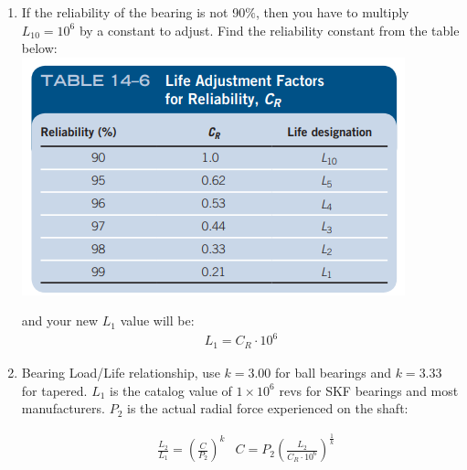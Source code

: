 \documentclass[11pt, fleqn]{article}
\begin{document}
\begin{enumerate}
\begin{enumerate}
            \item If the reliability of the bearing is not 90$\%$, then you have to multiply $L_{10} = 10^6$ by a constant to adjust. Find the reliability constant from the table below:\\
            \includegraphics[scale=.75]{Shafts/reliability.png}

            and your new $L_1$ value will be:
            \begin{align*}
                L_1 = C_R \cdot 10^6 
            \end{align*}
            
            \item Bearing Load/Life relationship, use $k=3.00$ for ball bearings and $k=3.33$ for tapered.  $L_1$ is the catalog value of $1\times 10^6$ revs for SKF bearings and most manufacturers.  $P_2$ is the actual radial force experienced on the shaft:   
            
            \begin{align*}
                &\frac{L_2}{L_1}=(\frac{C}{P_2})^k
                &C = P_2(\frac{L_2}{C_R\cdot 10^6})^{\frac{1}{k}}
            \end{align*}                       
        \end{enumerate}


\end{enumerate}
\end{document}
